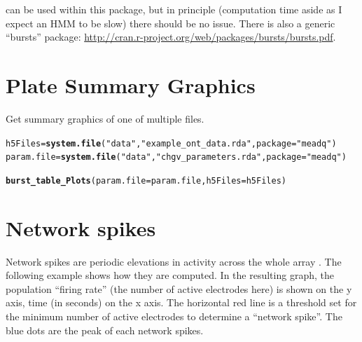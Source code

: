 \documentclass{article}\usepackage[]{graphicx}\usepackage[]{color}
\makeatletter
\newcommand{\hlstr}[1]{\textcolor[rgb]{0.192,0.494,0.8}{#1}}%
\newcommand{\hlstd}[1]{\textcolor[rgb]{0.345,0.345,0.345}{#1}}%
\newcommand{\hlkwb}[1]{\textcolor[rgb]{0.69,0.353,0.396}{#1}}%
\newcommand{\hlkwc}[1]{\textcolor[rgb]{0.333,0.667,0.333}{#1}}%
\newcommand{\hlkwd}[1]{\textcolor[rgb]{0.737,0.353,0.396}{\textbf{#1}}}%
\newenvironment{kframe}{%
 \def\at@end@of@kframe{}%
 \ifinner\ifhmode%
  \def\at@end@of@kframe{\end{minipage}}%
  \begin{minipage}{\columnwidth}%
 \fi\fi%
 \def\FrameCommand##1{\hskip\@totalleftmargin \hskip-\fboxsep
 \colorbox{shadecolor}{##1}\hskip-\fboxsep
     \hskip-\linewidth \hskip-\@totalleftmargin \hskip\columnwidth}%
 \MakeFramed {\advance\hsize-\width
   \@totalleftmargin\z@ \linewidth\hsize
   \@setminipage}}%
 {\par\unskip\endMakeFramed%
 \at@end@of@kframe}
\newenvironment{knitrout}{}{} %
\makeatother
\begin{document}
can be used within this package, but in principle (computation time
aside as I expect an HMM to be slow) there should be no issue.  There
is also a generic ``bursts'' package:
\url{http://cran.r-project.org/web/packages/bursts/bursts.pdf}.



\section*{Plate Summary Graphics}

Get summary graphics of one of multiple files.

\begin{knitrout}
\color{fgcolor}\begin{kframe}
\begin{alltt}
\hlstd{h5Files} \hlkwb{=} \hlkwd{system.file}\hlstd{(}\hlstr{"data"}\hlstd{,} \hlstr{"example_ont_data.rda"}\hlstd{,} \hlkwc{package} \hlstd{=} \hlstr{"meadq"}\hlstd{)}
\hlstd{param.file} \hlkwb{=} \hlkwd{system.file}\hlstd{(}\hlstr{"data"}\hlstd{,} \hlstr{"chgv_parameters.rda"}\hlstd{,} \hlkwc{package} \hlstd{=} \hlstr{"meadq"}\hlstd{)}

\hlkwd{burst_table_Plots}\hlstd{(}\hlkwc{param.file} \hlstd{= param.file,} \hlkwc{h5Files} \hlstd{= h5Files)}
\end{alltt}


{\ttfamily\noindent\itshape\color{messagecolor}{\#\# HDF5: unable to open file}}

{\ttfamily\noindent\bfseries\color{errorcolor}{\#\# Error: Error in h5checktypeOrOpenLoc(). File 'C:/Users/Diana/R/win-library/3.1/meadq/data/example\_ont\_data.rda' is not a valid HDF5 file.}}\end{kframe}
\end{knitrout}








\section*{Network spikes}

Network spikes are periodic elevations in activity across the whole
array \citep{Eytan2006}.  The following example shows how they are computed.
In the resulting graph, the population ``firing rate'' (the number of
active electrodes here) is shown on the y axis, time (in seconds) on
the x axis.  The horizontal red line is a threshold set for the
minimum number of active electrodes to determine a ``network spike''.
The blue dots are the peak of each network spikes.
\end{document}
